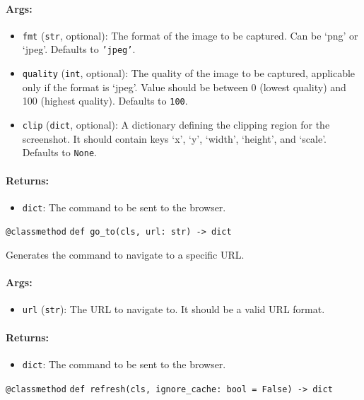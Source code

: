 \documentclass{article}
\begin{document}
\paragraph{Args:}
\begin{itemize}
    \item \texttt{fmt} (\texttt{str}, optional): The format of the image to be captured. Can be `png' or `jpeg'. Defaults to \texttt{'jpeg'}.
    \item \texttt{quality} (\texttt{int}, optional): The quality of the image to be captured, applicable only if the format is `jpeg'. Value should be between 0 (lowest quality) and 100 (highest quality). Defaults to \texttt{100}.
    \item \texttt{clip} (\texttt{dict}, optional): A dictionary defining the clipping region for the screenshot. It should contain keys `x', `y', `width', `height', and `scale'. Defaults to \texttt{None}.
\end{itemize}

\paragraph{Returns:}
\begin{itemize}
    \item \texttt{dict}: The command to be sent to the browser.
\end{itemize}

\noindent\texttt{@classmethod}
\noindent\texttt{def go\_to(cls, url: str) -> dict}

\noindent Generates the command to navigate to a specific URL.

\paragraph{Args:}
\begin{itemize}
    \item \texttt{url} (\texttt{str}): The URL to navigate to. It should be a valid URL format.
\end{itemize}

\paragraph{Returns:}
\begin{itemize}
    \item \texttt{dict}: The command to be sent to the browser.
\end{itemize}

\noindent\texttt{@classmethod}
\noindent\texttt{def refresh(cls, ignore\_cache: bool = False) -> dict}
\end{document}
